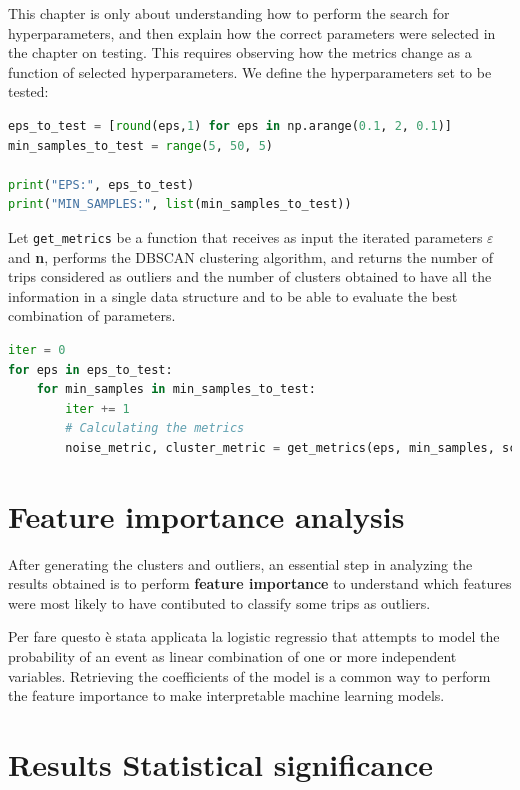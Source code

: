 This chapter is only about understanding how to perform the search for hyperparameters, and then explain how the correct parameters were selected in the chapter on testing.
This requires observing how the metrics change as a function of selected hyperparameters. We define the hyperparameters set to be tested:

\begin{minipage}{\linewidth}
\begin{lstlisting}[language=Python]
eps_to_test = [round(eps,1) for eps in np.arange(0.1, 2, 0.1)]
min_samples_to_test = range(5, 50, 5)

print("EPS:", eps_to_test)
print("MIN_SAMPLES:", list(min_samples_to_test))
\end{lstlisting}
\end{minipage}

Let \verb|get_metrics| be a function that receives as input the iterated parameters $\varepsilon$ and \textbf{n}, performs the DBSCAN clustering algorithm, and returns the number of trips considered as outliers and the number of clusters obtained to have all the information in a single data structure and to be able to evaluate the best combination of parameters.

\begin{minipage}{\linewidth}
\begin{lstlisting}[language=Python]
iter = 0
for eps in eps_to_test:
    for min_samples in min_samples_to_test:
        iter += 1
        # Calculating the metrics
        noise_metric, cluster_metric = get_metrics(eps, min_samples, scaled_df, iter)
\end{lstlisting}
\end{minipage}

\section{Feature importance analysis}

After generating the clusters and outliers, an essential step in analyzing the results obtained is to perform \textbf{feature importance} to understand which features were most likely to have contibuted to classify some trips as outliers.

Per fare questo è stata applicata la logistic regressio that attempts to model the probability of an event as linear combination of one or more independent variables. Retrieving the coefficients of the model is a common way to perform the feature importance to make interpretable machine learning models.
\label{sec:importance}

\section{Results Statistical significance}
\label{sec:significance}
